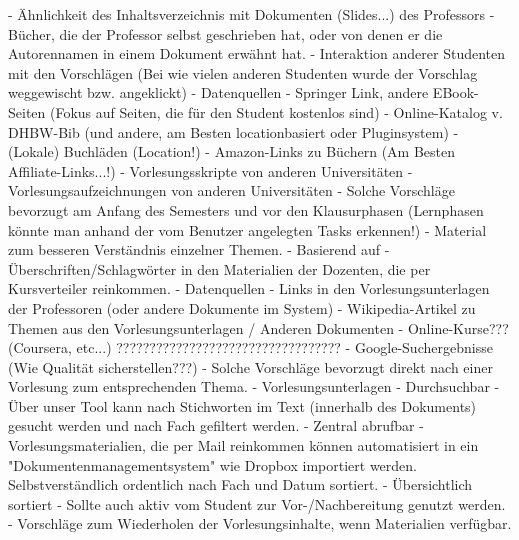                             - Ähnlichkeit des Inhaltsverzeichnis mit Dokumenten (Slides...) des Professors
                            - Bücher, die der Professor selbst geschrieben hat, oder von denen er die Autorennamen in einem Dokument erwähnt hat.
                            - Interaktion anderer Studenten mit den Vorschlägen (Bei wie vielen anderen Studenten wurde der Vorschlag weggewischt bzw. angeklickt)
                        - Datenquellen
                            - Springer Link, andere EBook-Seiten (Fokus auf Seiten, die für den Student kostenlos sind)
                            - Online-Katalog v. DHBW-Bib (und andere, am Besten locationbasiert oder Pluginsystem)
                            - (Lokale) Buchläden (Location!)
                            - Amazon-Links zu Büchern (Am Besten Affiliate-Links...!)
                            - Vorlesungsskripte von anderen Universitäten
                            - Vorlesungsaufzeichnungen von anderen Universitäten
                        - Solche Vorschläge bevorzugt am Anfang des Semesters und vor den Klausurphasen (Lernphasen könnte man anhand der vom Benutzer angelegten Tasks erkennen!)
                - Material zum besseren Verständnis einzelner Themen.
                    - Basierend auf
                        - Überschriften/Schlagwörter in den Materialien der Dozenten, die per Kursverteiler reinkommen.
                    - Datenquellen
                        - Links in den Vorlesungsunterlagen der Professoren (oder andere Dokumente im System)
                        - Wikipedia-Artikel zu Themen aus den Vorlesungsunterlagen / Anderen Dokumenten
                        - Online-Kurse??? (Coursera, etc...) ??????????????????????????????????
                        - Google-Suchergebnisse (Wie Qualität sicherstellen???)
                    - Solche Vorschläge bevorzugt direkt nach einer Vorlesung zum entsprechenden Thema.
                - Vorlesungsunterlagen
                    - Durchsuchbar
                        - Über unser Tool kann nach Stichworten im Text (innerhalb des Dokuments) gesucht werden und nach Fach gefiltert werden.
                    - Zentral abrufbar
                        - Vorlesungsmaterialien, die per Mail reinkommen können automatisiert in ein "Dokumentenmanagementsystem" wie Dropbox importiert werden. Selbstverständlich ordentlich nach Fach und Datum sortiert.
                    - Übersichtlich sortiert
                    - Sollte auch aktiv vom Student zur Vor-/Nachbereitung genutzt werden.
                        - Vorschläge zum Wiederholen der Vorlesungsinhalte, wenn Materialien verfügbar.

